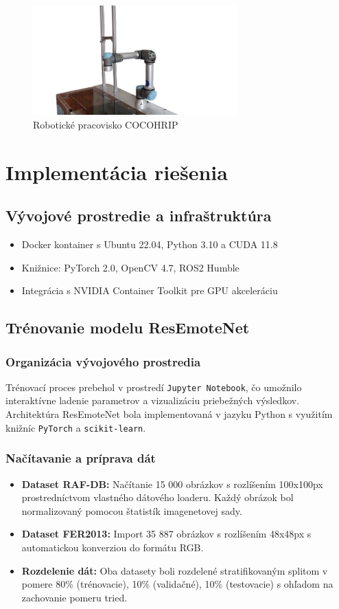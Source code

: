 \begin{figure}[h]
\centering
\includegraphics[width=0.7\textwidth]{img/cocohrip.png}
\caption{Robotické pracovisko COCOHRIP}
\end{figure}

\section{Implementácia riešenia}
\label{sec:implementation}
\subsection{Vývojové prostredie a infraštruktúra}
\begin{itemize}
\item Docker kontainer s Ubuntu 22.04, Python 3.10 a CUDA 11.8
\item Knižnice: PyTorch 2.0, OpenCV 4.7, ROS2 Humble
\item Integrácia s NVIDIA Container Toolkit pre GPU akceleráciu
\end{itemize}

\subsection{Trénovanie modelu ResEmoteNet}
\subsubsection{Organizácia vývojového prostredia}
Trénovací proces prebehol v prostredí \texttt{Jupyter Notebook}, čo umožnilo interaktívne ladenie parametrov a vizualizáciu priebežných výsledkov. Architektúra ResEmoteNet bola implementovaná v jazyku Python s využitím knižníc \texttt{PyTorch} a \texttt{scikit-learn}.

\subsubsection{Načítavanie a príprava dát}
\begin{itemize}
\item \textbf{Dataset RAF-DB:} Načítanie 15 000 obrázkov s rozlíšením 100x100px prostredníctvom vlastného dátového loaderu. Každý obrázok bol normalizovaný pomocou štatistík imagenetovej sady.
\item \textbf{Dataset FER2013:} Import 35 887 obrázkov s rozlíšením 48x48px s automatickou konverziou do formátu RGB.
\item \textbf{Rozdelenie dát:} Oba datasety boli rozdelené stratifikovaným splitom v pomere 80\% (trénovacie), 10\% (validačné), 10\% (testovacie) s ohľadom na zachovanie pomeru tried.
\end{itemize}

